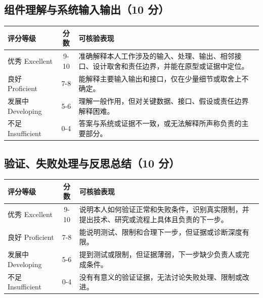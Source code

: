 \documentclass[11pt]{article}
\newcommand{\formaltable}{%
  \small
  \setlength{\tabcolsep}{5pt}%
  \renewcommand{\arraystretch}{1.2}%
  \setlength{\arrayrulewidth}{0.4pt}%
}
\renewcommand{\arraystretch}{1.2}
\begin{document}
\subsection{组件理解与系统输入输出（10 分）}
\begin{center}
\formaltable
\begin{tabularx}{\textwidth}{|l|c|Y|}
\hline
\textbf{评分等级} & \textbf{分数} & \textbf{可核验表现} \\ \hline
优秀 Excellent & 9-10 & 准确解释本人工作涉及的输入、处理、输出、相邻接口、设计取舍和责任边界，并能在原型或证据中定位。 \\ \hline
良好 Proficient & 7-8 & 能解释主要输入输出和接口，仅在少量细节或取舍上不确定。 \\ \hline
发展中 Developing & 5-6 & 理解一般作用，但对关键数据、接口、假设或责任边界解释困难。 \\ \hline
不足 Insufficient & 0-4 & 答案与系统或证据不一致，或无法解释所声称负责的主要部分。 \\ \hline
\end{tabularx}
\end{center}

\subsection{验证、失败处理与反思总结（10 分）}
\begin{center}
\formaltable
\begin{tabularx}{\textwidth}{|l|c|Y|}
\hline
\textbf{评分等级} & \textbf{分数} & \textbf{可核验表现} \\ \hline
优秀 Excellent & 9-10 & 说明本人如何验证正常和失败条件，识别真实限制，并提出技术、研究或流程上具体且负责的下一步。 \\ \hline
良好 Proficient & 7-8 & 能说明测试、限制和合理下一步，但证据或诊断深度有限。 \\ \hline
发展中 Developing & 5-6 & 提到测试或限制，但证据薄弱，下一步缺少负责人或完成条件。 \\ \hline
不足 Insufficient & 0-4 & 没有有意义的验证证据，无法讨论失败处理、限制或改进。 \\ \hline
\end{tabularx}
\end{center}
\end{document}
